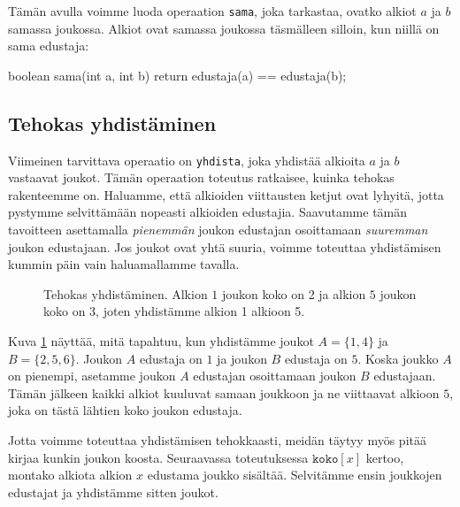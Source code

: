Tämän avulla voimme luoda operaation \texttt{sama}, joka tarkastaa,
ovatko alkiot $a$ ja $b$ samassa joukossa.
Alkiot ovat samassa joukossa täsmälleen silloin, kun niillä
on sama edustaja:

\begin{code}
boolean sama(int a, int b) {
    return edustaja(a) == edustaja(b);
}
\end{code}

\subsection{Tehokas yhdistäminen}

Viimeinen tarvittava operaatio on \texttt{yhdista}, joka yhdistää alkioita
$a$ ja $b$ vastaavat joukot.
Tämän operaation toteutus ratkaisee, kuinka tehokas rakenteemme on.
Haluamme, että alkioiden viittausten ketjut ovat lyhyitä,
jotta pystymme selvittämään nopeasti alkioiden edustajia.
Saavutamme tämän tavoitteen asettamalla \emph{pienemmän} joukon
edustajan osoittamaan \emph{suuremman} joukon edustajaan.
Jos joukot ovat yhtä suuria, voimme toteuttaa yhdistämisen
kummin päin vain haluamallamme tavalla.

\begin{figure}
\center
\begin{center}
\end{center}
\caption{Tehokas yhdistäminen. Alkion $1$ joukon koko on 2
ja alkion $5$ joukon koko on 3,
joten yhdistämme alkion 1 alkioon 5.}
\label{fig:tehyhd}
\end{figure}

Kuva \ref{fig:tehyhd} näyttää, mitä tapahtuu, kun yhdistämme joukot
$A=\{1,4\}$ ja $B=\{2,5,6\}$.
Joukon $A$ edustaja on $1$ ja joukon $B$ edustaja on $5$.
Koska joukko $A$ on pienempi, asetamme joukon $A$
edustajan osoittamaan joukon $B$ edustajaan.
Tämän jälkeen kaikki alkiot kuuluvat samaan joukkoon ja
ne viittaavat alkioon $5$, joka on tästä lähtien koko joukon edustaja.

Jotta voimme toteuttaa yhdistämisen tehokkaasti,
meidän täytyy myös pitää kirjaa kunkin joukon koosta.
Seuraavassa toteutuksessa $\texttt{koko}[x]$ kertoo,
montako alkiota alkion $x$ edustama joukko sisältää.
Selvitämme ensin joukkojen edustajat ja yhdistämme sitten joukot.

